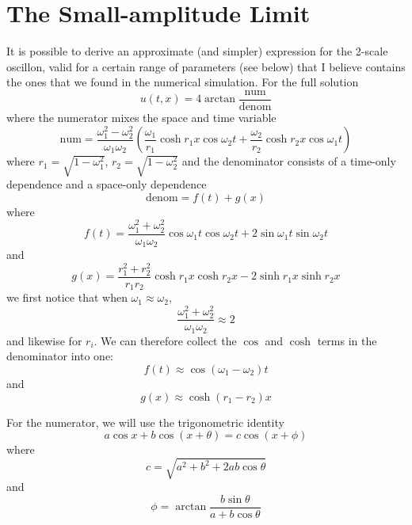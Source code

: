 \documentclass{report}
\begin{document}
\section{The Small-amplitude Limit}
It is possible to derive an approximate (and simpler) expression for the 2-scale oscillon, valid for a certain range of parameters (see below) that I believe contains the ones that we found in the numerical simulation. For the full solution
\begin{equation}
  u(t,x)=4 \arctan \frac{\textrm{num}}{\textrm{denom}}
\end{equation}
where the numerator mixes the space and time variable
\begin{equation}
  \textrm{num} = \frac{\omega_1^2-\omega_2^2}{\omega_1 \omega_2} \left(\frac{\omega_1}{r_1} \cosh r_1 x \cos\omega_2 t + \frac{\omega_2}{r_2} \cosh r_2 x \cos\omega_1 t \right)
\end{equation}
where $r_1=\sqrt{1-\omega_1^2}$, $r_2=\sqrt{1-\omega_2^2}$ and the denominator consists of a time-only dependence and a space-only dependence
\begin{equation}
    \textrm{denom} = f(t) + g(x)
\end{equation}
where
\begin{equation}
  f(t) = \frac{\omega_1^2+\omega_2^2}{\omega_1 \omega_2} \cos \omega_1 t \cos \omega_2 t +2 \sin \omega_1 t \sin \omega_2 t
\end{equation}
and
\begin{equation}
  g(x) = \frac{r_1^2+r_2^2}{r_1 r_2} \cosh r_1 x \cosh r_2 x-2  \sinh r_1 x \sinh r_2 x
\end{equation}
we first notice that when $\omega_1\approx\omega_2$,
\begin{equation}
  \frac{\omega_1^2+\omega_2^2}{\omega_1 \omega_2} \approx 2
\end{equation}
and likewise for $r_i$. We can therefore collect the $\cos$ and $\cosh$ terms in the denominator into one:
\begin{equation}
  f(t) \approx \cos (\omega_1-\omega_2) t
\end{equation}
and
\begin{equation}
  g(x) \approx \cosh (r_1-r_2) x
\end{equation}

For the numerator, we will use the trigonometric identity
\begin{equation}
  a\cos x + b \cos(x+\theta) = c \cos(x+\phi)
\end{equation}
where
\begin{equation}
  c = \sqrt{a^2+b^2+2ab\cos\theta}
\end{equation}
and
\begin{equation}
  \phi=\arctan \frac{b\sin\theta}{a+b\cos\theta}
\end{equation}
\end{document}
